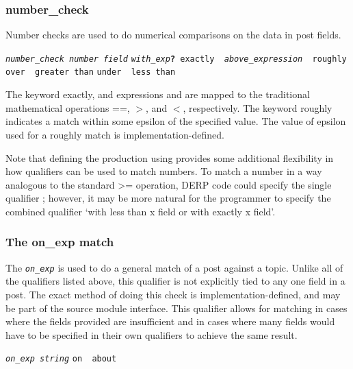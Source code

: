 \subsubsection{number\_check}
Number checks are used to do numerical comparisons on the data in post fields.
\begin{description}[labelindent=1cm,leftmargin=\onelen,labelwidth=1cm]
          \texttt{\textit{number\_check number field}}
          \texttt{\textit{with\_exp}\textbf{?} exactly \textbf{\textbar} \textit{above\_expression} \textbf{\textbar} roughly}
          \texttt{over \textbf{\textbar} greater than}
          \texttt{under \textbf{\textbar} less than}
\end{description}
The keyword exactly, and expressions  and  are mapped to the traditional mathematical operations ==, $>$, and $<$, respectively.
The keyword roughly indicates a match within some epsilon of the specified value. The value of epsilon used for a roughly match is implementation-defined.

Note that defining the  production using  provides some additional flexibility in how qualifiers can be used to match numbers. To match a
number in a way analogous to the standard >= operation, DERP code could specify the single qualifier ; however, it may be more natural
for the programmer to specify the combined qualifier ‘with less than x field or with exactly x field’.





\subsubsection{The on\_exp match}\label{onexp}
The \texttt{\textit{on\_exp}} is used to do a general match of a post against a topic. Unlike all of the qualifiers listed above, this qualifier is not explicitly
tied to any one field in a post. The exact method of doing this check is implementation-defined, and may be part of the source module interface. This qualifier
allows for matching in cases where the fields provided are insufficient and in cases where many fields would have to be specified in their own qualifiers to achieve
the same result.
\begin{description}[labelindent=1cm,leftmargin=\onelen,labelwidth=1cm]
       \texttt{\textit{on\_exp string}}
       \texttt{on \textbf{\textbar} about}
\end{description}




